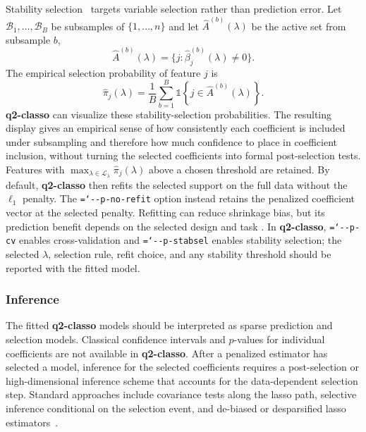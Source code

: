 \documentclass[11pt,a4paper]{article}
\newcommand{\code}[1]{\allowbreak\texttt{\hyphenchar\font=`\-\relax #1}}
\newcommand{\pkg}[1]{\textbf{#1}}
\begin{document}
Stability selection~\citep{meinshausen2010stability} targets variable selection
rather than prediction error. Let
$\mathcal{B}_1,\ldots,\mathcal{B}_B$ be subsamples of $\{1,\ldots,n\}$ and let
$\widehat{A}^{(b)}(\lambda)$ be the active set from subsample $b$,
\begin{equation}
\label{eq:classo-active-set}
\widehat{A}^{(b)}(\lambda)=
\{j:\widehat{\beta}^{(b)}_j(\lambda)\ne 0\}.
\end{equation}
The empirical selection probability of feature
$j$ is
\begin{equation}
\label{eq:classo-stability}
\widehat{\pi}_j(\lambda) =
\frac{1}{B}\sum_{b=1}^{B}
\mathbb{1}\!\left\{j\in\widehat{A}^{(b)}(\lambda)\right\}.
\end{equation}
\pkg{q2-classo} can visualize these stability-selection probabilities. The
resulting display gives an empirical sense of how consistently each coefficient
is included under subsampling and therefore how much confidence to place in
coefficient inclusion, without turning the selected coefficients into formal
post-selection tests.
Features with $\max_{\lambda\in\mathcal{L}_{\lambda}}\widehat{\pi}_j(\lambda)$ above a chosen
threshold are retained. By default, \pkg{q2-classo} then refits the selected
support on the full data without the $\ell_1$ penalty. The
\code{-{}-p-no-refit} option instead retains the penalized coefficient vector
at the selected penalty. Refitting can reduce shrinkage bias, but its
prediction benefit depends on the selected design and task
\citep{lederer2013trust}. In \pkg{q2-classo}, \code{-{}-p-cv} enables
cross-validation and \code{-{}-p-stabsel} enables stability selection; the
selected $\lambda$, selection rule, refit choice, and any stability threshold
should be reported with the fitted model.

\subsubsection{Inference}
\label{sec:classo-inference}

The fitted \pkg{q2-classo} models should be interpreted as sparse prediction and
selection models. Classical confidence intervals and $p$-values for individual
coefficients are not available in \pkg{q2-classo}. After a penalized estimator
has selected a model, inference for the selected coefficients requires a post-selection or high-dimensional
inference scheme that accounts for the data-dependent selection step. Standard
approaches include covariance tests along the lasso path, selective inference
conditional on the selection event, and de-biased or desparsified lasso
estimators~\citep{lockhart2014significance,lee2016exact,
javanmard2014confidence,zhang2014confidence,vandegeer2014asymptotically}.
\end{document}
